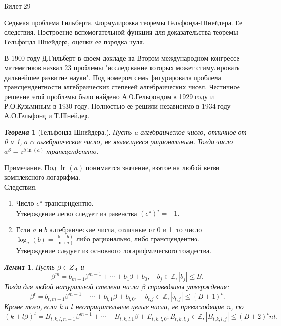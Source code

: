 \documentclass[a4paper,12pt]{article}
\newtheorem{teo}{\textit{Теорема}}
\newtheorem{lem}{\textit{Лемма}}
\newcommand{\AL}{\alpha}
\newcommand{\q}{\quad}
\newcommand{\bb}[1]{\mathbb{#1}}
\begin{document}
\newpage
\begin{mybox}{\hypertarget{bil29}{Билет 29}}

\begin{formbox}{}
Седьмая проблема Гильберта. Формулировка теоремы Гельфонда-Шнейдера. Ее следствия. Построение вспомогательной функции для доказательства теоремы Гельфонда-Шнейдера, оценки ее порядка нуля.
\end{formbox}

В 1900 году Д.Гильберт в своем докладе на Втором международном конгрессе математиков назвал 23 проблемы "исследование которых может стимулировать дальнейшее развитие науки". Под номером семь фигурировала проблема трансцендентности алгебраических степеней алгебраических чисел. Частичное решение этой проблемы было найдено А.О.Гельфондом в 1929 году и Р.О.Кузьминым
в 1930 году. Полностью ее решили независимо в 1934 году А.О.Гельфонд и Т.Шнейдер.
\begin{formbox}{}
\begin{teo}[Гельфонда Шнейдера.]
Пусть a алгебраическое число, отличное от 0 и 1, а $\AL$ алгебраическое число, не являющееся рациональным. Тогда число $a^\beta = e^{\beta \ln (a)}$ трансцендентно.
\end{teo}
\end{formbox}
Примечание. Под $\ln (a)$ понимается значение, взятое на любой ветви комплексного логарифма.\\
Следствия. 
\begin{enumerate}
\item Число $e^\pi$ трансцендентно.\\
Утверждение легко следует из равенства $(e^\pi)^i = -1.$
\item Если $a$ и $b$ алгебраические числа, отличные от 0 и 1, то число $\log_a(b) = \frac{\ln(b)}{\ln(a)}$ либо рационально, либо трансцендентно.\\
Утверждение следует из основного логарифмического тождества.
\end{enumerate}

\begin{formbox}{}
\begin{lem}
Пусть \(\beta\in Z_A\) и
\begin{equation}
\beta^m = b_{m-1}\beta^{m-1} + \cdots + b_1\beta + b_0, \q b_j \in \bb{Z}, |b_j| \le B. \label{eq::8}\end{equation}
Тогда для любой натуральной степени числа $\beta$ справедливы утверждения:\\
$$\beta^t = b_{t,m-1}\beta^{m-1} + \cdots + b_{t,1}\beta + b_{t,0},\q b_{t,j} \in \bb{Z}, |b_{t,j} | \le (B + 1)^t.$$
Кроме того, если $k$ и $l$ неотрицательные целые числа, не превосходящие $n$, то
\[(k + l\beta)^t = B_{t,k,l,m-1}\beta^{m-1} + \cdots + B_{t,k,l,1}\beta + B_{t,k,l,0}; B_{t,k,l,j}\in \bb{Z}, |B_{t,k,l,j} | \le (B + 2)^tnt.\]
\end{lem}
\end{formbox}



\end{mybox}
\end{document}
